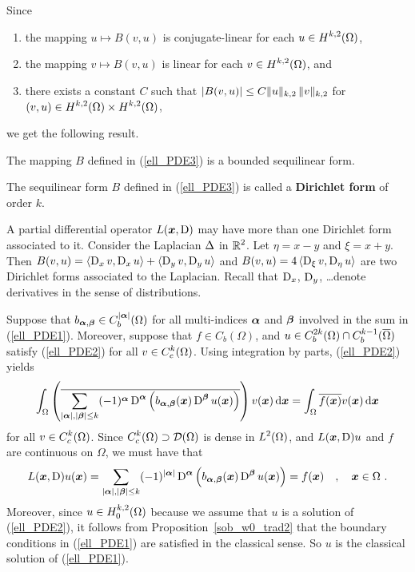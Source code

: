 Since
\begin{enumerate}
\item the mapping $u \mapsto B(v,u)$ is conjugate-linear for each
$\displaystyle u\in H^{k,2}(\Omega)$,
\item the mapping $v \mapsto B(v,u)$ is linear for each
$\displaystyle v\in H^{k,2}(\Omega)$, and
\item there exists a constant $C$ such that
$\displaystyle \left| B(v,u) \right| \leq C \| u\|_{k,2} \, \| v\|_{k,2}$
for $\displaystyle (v,u) \in H^{k,2}(\Omega) \times H^{k,2}(\Omega)$,
\end{enumerate}
we get the following result.

\begin{prop} \label{ell_Bblf}
The mapping $B$ defined in (\ref{ell_PDE3}) is a bounded sequilinear form.
\end{prop}

The sequilinear form $B$ defined in (\ref{ell_PDE3}) is
called a {\bfseries Dirichlet form} of order $k$.

\begin{rmk}
A partial differential operator $L({\bm{x}},\operatorname{D})$ may have more than one
Dirichlet form associated to it.  Consider the Laplacian
$\displaystyle \Delta$ in $\displaystyle \mathbb{R}^2$.  Let $\eta=x-y$ and
$\xi = x+y$.
Then $B(v,u) = \left\langle{\operatorname{D}_x v} , {\operatorname{D}_x u}\right\rangle + \left\langle{\operatorname{D}_y v} , {\operatorname{D}_y u}\right\rangle$ and
$B(v,u) = 4\left\langle{\operatorname{D}_\xi v} , {\operatorname{D}_\eta u}\right\rangle$ are two Dirichlet forms associated
to the Laplacian.  Recall that $\operatorname{D}_x$, $\operatorname{D}_y$, \ldots denote derivatives
in the sense of distributions.
\end{rmk}

Suppose that $\displaystyle b_{{\bm{\alpha}},{\bm{\beta}}}\in
C^{|{\bm{\alpha}}|}_b(\Omega)$
for all multi-indices ${\bm{\alpha}}$ and ${\bm{\beta}}$ involved in the sum in
(\ref{ell_PDE1}).  Moreover, suppose that $f\in C_b(\Omega)$, and
$\displaystyle u \in C^{2k}_b(\Omega)\cap C^{k-1}_b(\overline{\Omega})$
satisfy (\ref{ell_PDE2}) for all $\displaystyle v \in C^{k}_c(\Omega)$.  Using
integration by parts, (\ref{ell_PDE2}) yields
\[
\int_\Omega \left( \overline{\sum_{|{\bm{\alpha}}|,|{\bm{\beta}}|\leq k}
(-1)^{{\bm{\alpha}}} \operatorname{D}^{{\bm{\alpha}}}
\left( b_{{\bm{\alpha}},{\bm{\beta}}}({\bm{x}}) \operatorname{D}^{{\bm{\beta}}}
u({\bm{x}})\right)}\right)
v({\bm{x}}) \,\mathrm{d}{{\bm{x}}} = \int_\Omega \overline{f({\bm{x}})} v({\bm{x}})
\,\mathrm{d}{{\bm{x}}}
\]
for all $\displaystyle v \in C^{k}_c(\Omega)$.
Since $\displaystyle C^{k}_c(\Omega) \supset \mathcal{D}(\Omega)$ is
dense in $\displaystyle L^2(\Omega)$, and $L({\bm{x}},\operatorname{D})u$ and $f$
are continuous on $\Omega$, we must have that
\[
L({\bm{x}},\operatorname{D})u({\bm{x}}) =
\sum_{|{\bm{\alpha}}|,|{\bm{\beta}}|\leq k} (-1)^{|{\bm{\alpha}}|} \operatorname{D}^{{\bm{\alpha}}}
\left( b_{{\bm{\alpha}},{\bm{\beta}}}({\bm{x}}) \operatorname{D}^{{\bm{\beta}}}
u({\bm{x}})\right) = f({\bm{x}})
\quad , \quad {\bm{x}} \in \Omega \ .
\]
Moreover, since $\displaystyle u \in H^{k,2}_0(\Omega)$ because we assume that
$u$ is a solution of (\ref{ell_PDE2}), it follows from
Proposition~\ref{sob_w0_trad2} that the boundary
conditions in (\ref{ell_PDE1}) are satisfied in the classical sense.
So $u$ is the classical solution of (\ref{ell_PDE1}).

